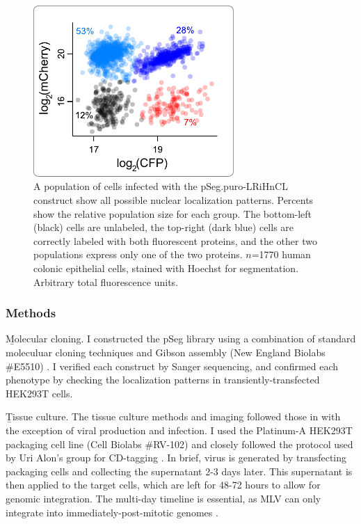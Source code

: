  \begin{figure}[tb]
  \centering
  \includegraphics[width=3in]{FIGS/pseg/mixed.pdf}
  {\singlespacing 
  \caption[ Requirement for pSeg clonal selection.]
            { A population of cells infected with the
              pSeg.puro-LRiHnCL construct show all possible
              nuclear localization patterns. Percents show
              the relative population size for each group.
              The bottom-left (black) cells are unlabeled,
              the top-right (dark blue) cells are correctly
              labeled with both fluorescent proteins, and
              the other two populations express only one
              of the two proteins. $n$=1770 human colonic
              epithelial cells, stained with Hoechst for
              segmentation. Arbitrary total fluorescence units.}
  \label{fig:pseg:mixed}}
  \end{figure}






\subsubsection{Methods}
\label{pseg:methods}

\b{Molecular cloning.}
I constructed the pSeg library using a combination 
of standard moleculuar cloning techniques and 
Gibson assembly (New England Biolabs \#E5510)
\cite{Gibson2010}. I verified each construct
by Sanger sequencing, and confirmed each phenotype
by checking the localization patterns in 
transiently-transfected HEK293T cells.


\b{Tissue culture.}
The tissue culture methods and imaging followed those
in  with the exception of
viral production and infection.
I used the Platinum-A HEK293T packaging
cell line (Cell Biolabs \#RV-102)
and closely followed the protocol used by Uri Alon's
group for CD-tagging \cite{Sigal2007}. 
In brief, virus is generated by transfecting packaging
cells and collecting the supernatant 2-3 days later. This
supernatant is then applied to the target cells, which
are left for 48-72 hours to allow for genomic integration. The
multi-day timeline is essential, as MLV can only
integrate into immediately-post-mitotic
genomes \cite{Roe1993}.



